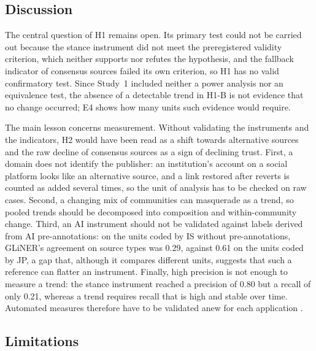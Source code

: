 \documentclass[10pt,a4paper]{article}
\begin{document}
\subsection{Discussion}
\label{sec:discussion}

The central question of H1 remains open. Its primary test could not be carried out
because the stance instrument did not meet the preregistered validity criterion, which
neither supports nor refutes the hypothesis, and the fallback indicator of consensus
sources failed its own criterion, so H1 has no valid confirmatory test. Since Study~1
included neither a power analysis nor an equivalence test, the absence of a detectable
trend in H1-B is not evidence that no change occurred; E4 shows how many units such
evidence would require.

The main lesson concerns measurement. Without validating the instruments and the
indicators, H2 would have been read as a shift towards alternative sources and the raw
decline of consensus sources as a sign of declining trust. First, a domain does not
identify the publisher: an institution's account on a social platform looks like an
alternative source, and a link restored after reverts is counted as added several times,
so the unit of analysis has to be checked on raw cases. Second, a changing mix of
communities can masquerade as a trend, so pooled trends should be decomposed into
composition and within-community change. Third, an AI instrument should not be validated
against labels derived from AI pre-annotations: on the units coded by IS without
pre-annotations, GLiNER's agreement on source types was 0.29,
against 0.61 on the units coded by JP, a gap that, although it compares different units, suggests that such a
reference can flatter an instrument.
Finally, high precision is not enough to measure a trend: the stance instrument reached a
precision of 0.80 but a recall of only
0.21, whereas a trend requires recall that is high and stable over
time. Automated measures therefore have to be validated anew for each application
\cite{grimmer2013}.

\subsection{Limitations}
\end{document}
